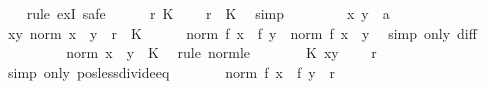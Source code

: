 \begin{isabellebody}
\ \ \isamarkupfalse%
\ {\isacharparenleft}{\kern0pt}rule\ exI{\isacharcomma}{\kern0pt}\ safe{\isacharparenright}{\kern0pt}\isanewline
\ \ \ \ \isamarkupfalse%
\ r\ K\ \isamarkupfalse%
\ {\isachardoublequoteopen}{}\ {\isacharless}{\kern0pt}\ r\ {\isacharslash}{\kern0pt}\ K{\isachardoublequoteclose}\ \isamarkupfalse%
\ simp\isanewline
\ \ \isamarkupfalse%
\isanewline
\ \ \ \ \isamarkupfalse%
\ x\ y\ {\isacharcolon}{\kern0pt}{\isacharcolon}{\kern0pt}\ {\isacharprime}{\kern0pt}a\isanewline
\ \ \ \ \isamarkupfalse%
\ xy{\isacharcolon}{\kern0pt}\ {\isachardoublequoteopen}norm\ {\isacharparenleft}{\kern0pt}x\ {\isacharminus}{\kern0pt}\ y{\isacharparenright}{\kern0pt}\ {\isacharless}{\kern0pt}\ r\ {\isacharslash}{\kern0pt}\ K{\isachardoublequoteclose}\isanewline
\ \ \ \ \isamarkupfalse%
\ {\isachardoublequoteopen}norm\ {\isacharparenleft}{\kern0pt}f\ x\ {\isacharminus}{\kern0pt}\ f\ y{\isacharparenright}{\kern0pt}\ {\isacharequal}{\kern0pt}\ norm\ {\isacharparenleft}{\kern0pt}f\ {\isacharparenleft}{\kern0pt}x\ {\isacharminus}{\kern0pt}\ y{\isacharparenright}{\kern0pt}{\isacharparenright}{\kern0pt}{\isachardoublequoteclose}\ \isamarkupfalse%
\ {\isacharparenleft}{\kern0pt}simp\ only{\isacharcolon}{\kern0pt}\ diff{\isacharparenright}{\kern0pt}\isanewline
\ \ \ \ \isamarkupfalse%
\ \isamarkupfalse%
\ {\isachardoublequoteopen}{\isasymdots}\ {\isasymle}\ norm\ {\isacharparenleft}{\kern0pt}x\ {\isacharminus}{\kern0pt}\ y{\isacharparenright}{\kern0pt}\ {\isacharasterisk}{\kern0pt}\ K{\isachardoublequoteclose}\ \isamarkupfalse%
\ {\isacharparenleft}{\kern0pt}rule\ norm{\isacharunderscore}{\kern0pt}le{\isacharparenright}{\kern0pt}\isanewline
\ \ \ \ \isamarkupfalse%
\ \isamarkupfalse%
\ K\ xy\ \isamarkupfalse%
\ {\isachardoublequoteopen}{\isasymdots}\ {\isacharless}{\kern0pt}\ r{\isachardoublequoteclose}\ \isamarkupfalse%
\ {\isacharparenleft}{\kern0pt}simp\ only{\isacharcolon}{\kern0pt}\ pos{\isacharunderscore}{\kern0pt}less{\isacharunderscore}{\kern0pt}divide{\isacharunderscore}{\kern0pt}eq{\isacharparenright}{\kern0pt}\isanewline
\ \ \ \ \isamarkupfalse%
\ \isamarkupfalse%
\ {\isachardoublequoteopen}norm\ {\isacharparenleft}{\kern0pt}f\ x\ {\isacharminus}{\kern0pt}\ f\ y{\isacharparenright}{\kern0pt}\ {\isacharless}{\kern0pt}\ r{\isachardoublequoteclose}\ \isacommand{{\isachardot}{\kern0pt}}\isamarkupfalse%

\end{isabellebody}
